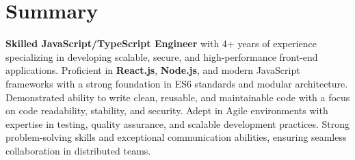 \section*{Summary}
\textbf{Skilled JavaScript/TypeScript Engineer} with 4+ years of experience specializing in developing scalable, secure, and high-performance front-end applications. Proficient in \textbf{React.js}, \textbf{Node.js}, and modern JavaScript frameworks with a strong foundation in ES6 standards and modular architecture. Demonstrated ability to write clean, reusable, and maintainable code with a focus on code readability, stability, and security. Adept in Agile environments with expertise in testing, quality assurance, and scalable development practices. Strong problem-solving skills and exceptional communication abilities, ensuring seamless collaboration in distributed teams.  
